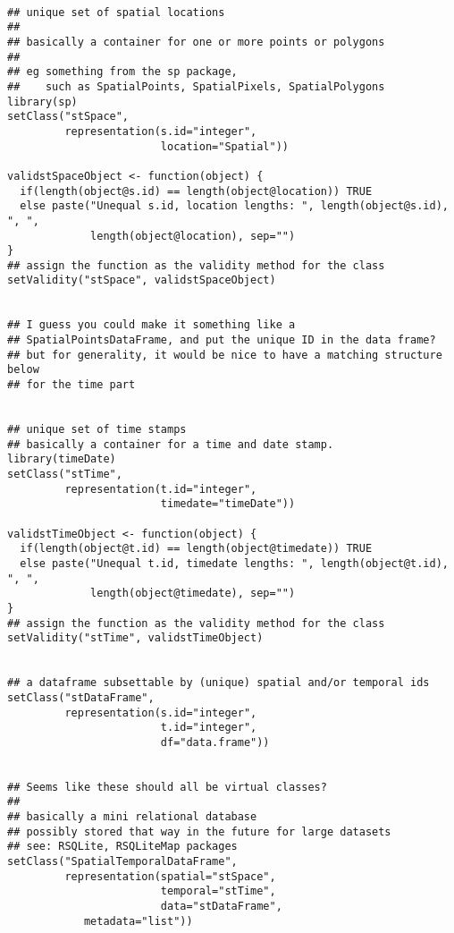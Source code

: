 \documentclass[12pt]{article}
\begin{document}
\begin{verbatim}

## unique set of spatial locations
##
## basically a container for one or more points or polygons
##
## eg something from the sp package,
##    such as SpatialPoints, SpatialPixels, SpatialPolygons
library(sp)
setClass("stSpace",
         representation(s.id="integer",
                        location="Spatial"))

validstSpaceObject <- function(object) {
  if(length(object@s.id) == length(object@location)) TRUE
  else paste("Unequal s.id, location lengths: ", length(object@s.id), ", ",
             length(object@location), sep="")
}
## assign the function as the validity method for the class
setValidity("stSpace", validstSpaceObject)


## I guess you could make it something like a
## SpatialPointsDataFrame, and put the unique ID in the data frame?
## but for generality, it would be nice to have a matching structure below
## for the time part


## unique set of time stamps
## basically a container for a time and date stamp.
library(timeDate)
setClass("stTime",
         representation(t.id="integer",
                        timedate="timeDate"))

validstTimeObject <- function(object) {
  if(length(object@t.id) == length(object@timedate)) TRUE
  else paste("Unequal t.id, timedate lengths: ", length(object@t.id), ", ",
             length(object@timedate), sep="")
}
## assign the function as the validity method for the class
setValidity("stTime", validstTimeObject)


## a dataframe subsettable by (unique) spatial and/or temporal ids
setClass("stDataFrame",
         representation(s.id="integer",
                        t.id="integer",
                        df="data.frame"))


## Seems like these should all be virtual classes?
##
## basically a mini relational database
## possibly stored that way in the future for large datasets
## see: RSQLite, RSQLiteMap packages
setClass("SpatialTemporalDataFrame",
         representation(spatial="stSpace",
                        temporal="stTime",
                        data="stDataFrame",
			metadata="list"))

\end{verbatim}

\end{document}
